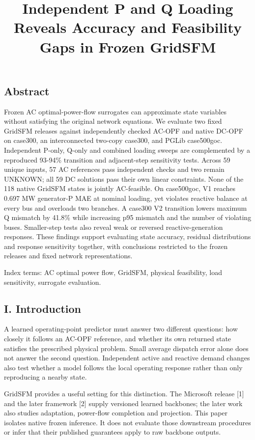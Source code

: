 \documentclass[conference]{IEEEtran}
\title{Independent P and Q Loading Reveals Accuracy and Feasibility Gaps in Frozen GridSFM}
\author{\IEEEauthorblockN{Ninad Sonawane}}
\begin{document}
\maketitle
\subsection*{Abstract}
Frozen AC optimal-power-flow surrogates can approximate state variables without satisfying the original network equations. We evaluate two fixed GridSFM releases against independently checked AC-OPF and native DC-OPF on case300, an interconnected two-copy case300, and PGLib case500goc. Independent P-only, Q-only and combined loading sweeps are complemented by a reproduced 93-94\% transition and adjacent-step sensitivity tests. Across 59 unique inputs, 57 AC references pass independent checks and two remain UNKNOWN; all 59 DC solutions pass their own linear constraints. None of the 118 native GridSFM states is jointly AC-feasible. On case500goc, V1 reaches 0.697 MW generator-P MAE at nominal loading, yet violates reactive balance at every bus and overloads two branches. A case300 V2 transition lowers maximum Q mismatch by 41.8\% while increasing p95 mismatch and the number of violating buses. Smaller-step tests also reveal weak or reversed reactive-generation responses. These findings support evaluating state accuracy, residual distributions and response sensitivity together, with conclusions restricted to the frozen releases and fixed network representations.

Index terms: AC optimal power flow, GridSFM, physical feasibility, load sensitivity, surrogate evaluation.

\subsection*{I. Introduction}
A learned operating-point predictor must answer two different questions: how closely it follows an AC-OPF reference, and whether its own returned state satisfies the prescribed physical problem. Small average dispatch error alone does not answer the second question. Independent active and reactive demand changes also test whether a model follows the local operating response rather than only reproducing a nearby state.

GridSFM provides a useful setting for this distinction. The Microsoft release [1] and the later framework [2] supply versioned learned backbones; the later work also studies adaptation, power-flow completion and projection. This paper isolates native frozen inference. It does not evaluate those downstream procedures or infer that their published guarantees apply to raw backbone outputs.
\end{document}
